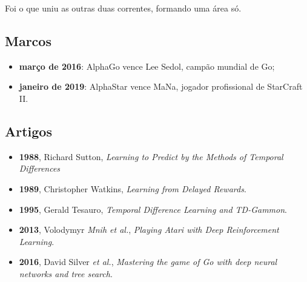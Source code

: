 \documentclass{article}
\begin{document}
        Foi o que uniu as outras duas correntes, formando uma área só.
        
    \subsection{Marcos}
    
        \begin{itemize}
            \item \textbf{março de 2016}: AlphaGo vence Lee Sedol, campão mundial de Go;
            \item \textbf{janeiro de 2019}: AlphaStar vence MaNa, jogador profissional de StarCraft II.
        \end{itemize}
    
    \subsection{Artigos}
    
        \begin{itemize}
            \item \textbf{1988}, Richard Sutton, \textit{Learning to Predict by the Methods of Temporal Differences}
            \item \textbf{1989}, Christopher Watkins, \textit{Learning from Delayed Rewards}.
            \item \textbf{1995}, Gerald Tesauro, \textit{Temporal Difference Learning and TD-Gammon}.
            \item \textbf{2013}, Volodymyr \textit{Mnih et al.}, \textit{Playing Atari with Deep Reinforcement Learning}.
            \item \textbf{2016}, David Silver \textit{et al.}, \textit{Mastering the game of Go with deep neural networks and tree search}.
        \end{itemize}

    
\end{document}
